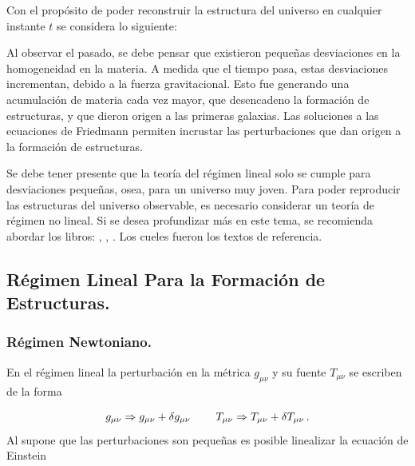 Con el propósito de poder reconstruir la estructura del universo en cualquier instante $t$ se considera lo siguiente:

Al observar el pasado, se debe pensar que existieron pequeñas desviaciones en la homogeneidad en la materia. A medida que el tiempo pasa, estas desviaciones incrementan, debido a la fuerza gravitacional. Esto fue generando una acumulación de materia cada vez mayor, que desencadeno la formación de estructuras, y que dieron origen a las primeras galaxias. Las soluciones a las ecuaciones de Friedmann permiten incrustar las perturbaciones que dan origen a la formación de estructuras.

Se debe tener presente que la teoría del régimen lineal solo se cumple para desviaciones pequeñas, osea, para un universo muy joven. Para poder reproducir las estructuras del universo observable, es necesario considerar un teoría de régimen no lineal. Si se desea profundizar más en este tema, se recomienda abordar los libros: \cite{padmanabhan1995}, \cite{longair2008}, \cite{coles2002}. Los cueles fueron los textos de referencia.


\subsection{Régimen Lineal Para la Formación de Estructuras.}
\label{subsec:Lineal_Estructure_Formation}


	\subsubsection{Régimen Newtoniano.}
	\label{subsubsec:Newtonian_Regimen}


En el régimen lineal la perturbación en la métrica $g_{\mu\nu}$ y su fuente $T_{\mu\nu}$ se escriben de la forma

\begin{equation}
g_{\mu\nu} \Rightarrow g_{\mu\nu}+\delta g_{\mu\nu} \hspace{0.8cm} T_{\mu\nu} \Rightarrow T_{\mu\nu} +\delta T_{\mu\nu} \,.
\end{equation}
%
Al supone que las perturbaciones son pequeñas es posible linealizar la ecuación de Einstein 

